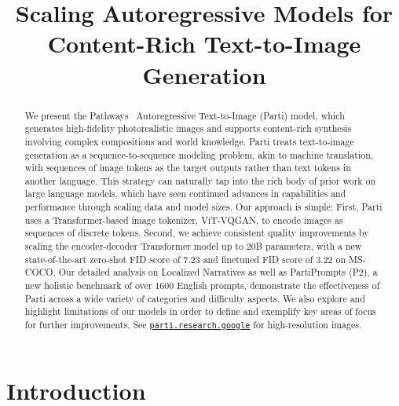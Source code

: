\title{Scaling Autoregressive Models for Content-Rich Text-to-Image Generation}

\begin{abstract}
We present the Pathways~\cite{PathwaysProgram} Autoregressive Text-to-Image (Parti) model, which generates high-fidelity photorealistic images and supports content-rich synthesis involving complex compositions and world knowledge. Parti treats text-to-image generation as a sequence-to-sequence modeling problem, akin to machine translation, with sequences of image tokens as the target outputs rather than text tokens in another language. This strategy can naturally tap into the rich body of prior work on large language models, which have seen continued advances in capabilities and performance through scaling data and model sizes. Our approach is simple: First, Parti uses a Transformer-based image tokenizer, ViT-VQGAN, to encode images as sequences of discrete tokens. Second, we achieve consistent quality improvements by scaling the encoder-decoder Transformer model up to 20B parameters, with a new state-of-the-art zero-shot FID score of 7.23 and finetuned FID score of 3.22 on MS-COCO. Our detailed analysis on Localized Narratives as well as PartiPrompts (P$2$), a new holistic benchmark of over 1600 English prompts, demonstrate the effectiveness of Parti across a wide variety of categories and difficulty aspects. We also explore and highlight limitations of our models in order to define and exemplify key areas of focus for further improvements. See \href{https://parti.research.google/}{\texttt{parti.research.google}} for high-resolution images.
\end{abstract}

\section{Introduction}

